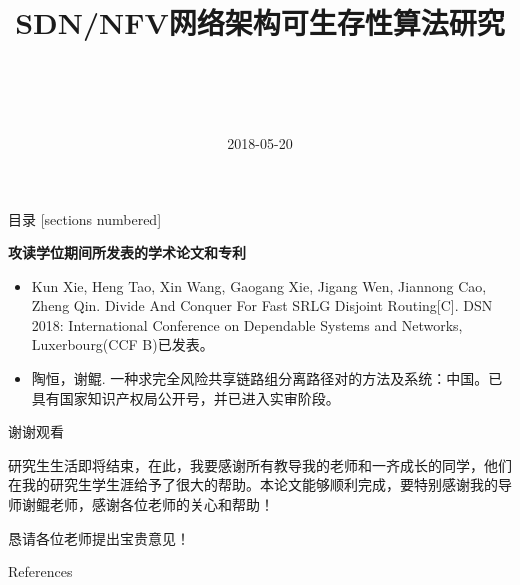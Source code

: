 \documentclass{beamer}
\title{SDN/NFV网络架构可生存性算法研究}
\author[陶恒]{
    \makebox[2.5em][s]{姓名:} \makebox[3em][s]{陶恒}\\
    \makebox[2.5em][s]{导师:} \makebox[3em][s]{谢鲲\ 教授} \\
    \makebox[2.5em][s]{专业:} \makebox[10em][l]{计算机科学与技术}\\
}
\date{2018-05-20}
\begin{document}
\maketitle

\begin{frame}{目录}
  [sections numbered]
  \tableofcontents[hideallsubsections]
\end{frame}





%
%
%
%
%
\begin{frame}
\textbf{攻读学位期间所发表的学术论文和专利}
\begin{itemize}
  \item Kun Xie, Heng Tao, Xin Wang, Gaogang Xie, Jigang Wen, Jiannong Cao, Zheng Qin. Divide And Conquer For Fast SRLG Disjoint Routing[C]. DSN 2018: International Conference on Dependable Systems and Networks, Luxerbourg(CCF B)已发表。
  \item 陶恒，谢鲲. 一种求完全风险共享链路组分离路径对的方法及系统：中国。已具有国家知识产权局公开号，并已进入实审阶段。
\end{itemize}
\end{frame}


\begin{frame}[standout]
\begin{center}
\huge{谢谢观看}
\end{center}
\begin{center}
研究生生活即将结束，在此，我要感谢所有教导我的老师和一齐成长的同学，他们在我的研究生学生涯给予了很大的帮助。本论文能够顺利完成，要特别感谢我的导师谢鲲老师，感谢各位老师的关心和帮助！
\end{center}
\begin{center}
  恳请各位老师提出宝贵意见！
\end{center}
\end{frame}

\begin{frame}[allowframebreaks]{References}
  \scriptsize
  
  
\end{frame}
\end{document}
